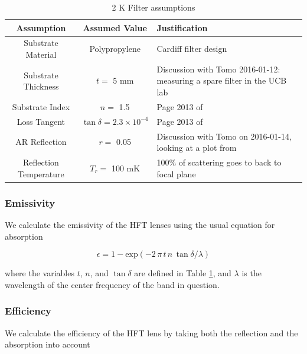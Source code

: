 \documentclass[12pt, titlepage]{article} %
\begin{document}
\begin{table}[H]
	\centering
	\begin{tabularx}{\textwidth}{|| c | c | X ||}
	\hline
	Assumption & Assumed Value & Justification \\
	\hline
	\hline
	Substrate Material & Polypropylene & Cardiff filter design \cite{cardiff} \\
	\hline
	Substrate Thickness & $t =$ 5 mm & Discussion with Tomo 2016-01-12: measuring a spare filter in the UCB lab \\
	\hline
	Substrate Index & $n =$ 1.5 & Page 2013 of \cite{lamb} \\
	\hline
	Loss Tangent & $\tan{\delta} = \mathrm{2.3 \times 10^{-4}}$ & Page 2013 of \cite{lamb} \\
	\hline
	AR Reflection & $r =$ 0.05 & Discussion with Tomo on 2016-01-14, looking at a plot from \cite{bolowikiMMF} \\
	\hline
	Reflection Temperature & $T_{r} =$ 100 mK & 100\% of scattering goes to back to focal plane \\
	\hline
	\end{tabularx}
\caption{2 K Filter assumptions \label{table:2kfAssmp}}
\end{table}


\subsubsection{Emissivity}

We calculate the emissivity of the HFT lenses using the usual equation for absorption

\begin{equation}
	\epsilon = 1 - \mathrm{exp} (- 2 \, \pi \, t \, n \, \tan{\delta} / \lambda )
	\label{eq:2kfDielLoss}
\end{equation}

where the variables $t$, $n$, and $\tan{\delta}$ are defined in Table \ref{table:2kfAssmp}, and $\lambda$ is the wavelength of the center frequency of the band in question.


\subsubsection{Efficiency}

We calculate the efficiency of the HFT lens by taking both the reflection and the absorption into account
\end{document}
